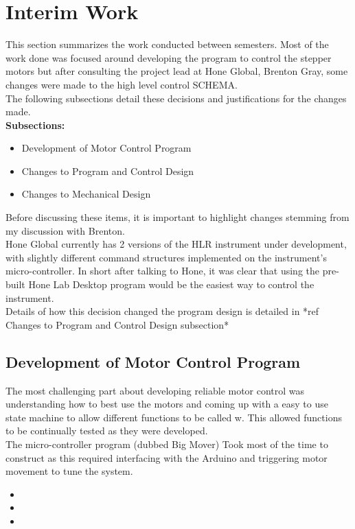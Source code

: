 \documentclass{UoNMCHA}
\numberwithin{equation}{section}
\begin{document}
\section{Interim Work}\label{sec:Interim Work}
This section summarizes the work conducted between semesters. Most of the work done was focused around developing the program to control the stepper motors but after consulting the project lead at Hone Global, Brenton Gray, some changes were made to the high level control SCHEMA. \\ 
The following subsections detail these decisions and justifications for the changes made. \\
\textbf{Subsections:}\\
\begin{itemize}
	\item Development of Motor Control Program
	\item Changes to Program and Control Design
	\item Changes to Mechanical Design
\end{itemize}
Before discussing these items, it is important to highlight changes stemming from my discussion with Brenton. \\
Hone Global currently has 2 versions of the HLR instrument under development, with slightly different command structures implemented on the instrument's micro-controller. In short after talking to Hone, it was clear that using the pre-built Hone Lab Desktop program would be the easiest way to control the instrument. \\
Details of how this decision changed the program design is detailed in *ref Changes to Program and Control Design subsection* \\
\subsection{Development of Motor Control Program}\label{sub:Development of Motor Control Program}
The most challenging part about developing reliable motor control was understanding how to best use the motors and coming up with a easy to use state machine to allow different functions to be called w. This allowed functions to be continually tested as they were developed.\\
The micro-controller program (dubbed Big Mover) Took most of the time to construct as this required interfacing with the Arduino and triggering motor movement to tune the system. \\
\begin{itemize}
	\item 
	\item 
	\item 
\end{itemize}
\end{document}
